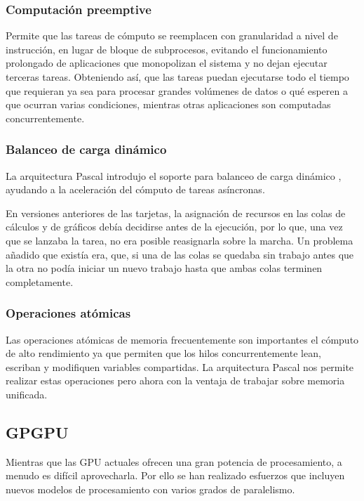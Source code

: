     \subsubsection{Computación \gls{preemptive}}
    Permite que las tareas de cómputo se reemplacen con granularidad a nivel de instrucción, en lugar de bloque de subprocesos, evitando el funcionamiento prolongado de aplicaciones que monopolizan el sistema y no dejan ejecutar terceras tareas\cite{WPNV}. Obteniendo así, que las tareas puedan ejecutarse todo el tiempo que requieran ya sea para procesar grandes volúmenes de datos o qué esperen a que ocurran varias condiciones, mientras otras aplicaciones son computadas concurrentemente.

    \subsubsection{Balanceo de carga dinámico}
        La arquitectura Pascal introdujo el soporte para balanceo de carga dinámico \cite{AnPasc},  ayudando a la aceleración del cómputo de tareas asíncronas.
        \vspace{0.3cm}
        
    En versiones anteriores de las tarjetas, la asignación de recursos en las colas de cálculos y de gráficos debía decidirse antes de la ejecución, por lo que, una vez que se lanzaba la tarea, no era posible reasignarla sobre la marcha. Un problema añadido que existía era, que, si una de las colas se quedaba sin trabajo antes que la otra no podía iniciar un nuevo trabajo hasta que ambas colas terminen completamente\cite{PasAna}.
    
    \subsubsection{Operaciones atómicas} 
    Las operaciones atómicas de memoria frecuentemente son importantes el cómputo de alto rendimiento ya que permiten que los hilos concurrentemente lean, escriban y modifiquen variables compartidas. La arquitectura Pascal nos permite realizar estas operaciones pero ahora con la ventaja de trabajar sobre memoria unificada.

    \subsection{\acrshort{GPGPU}}
    
    Mientras que las \acrshort{GPU} actuales ofrecen una gran potencia de procesamiento, a menudo es difícil aprovecharla. Por ello se han realizado esfuerzos que incluyen nuevos modelos de procesamiento con varios grados de paralelismo.
                
